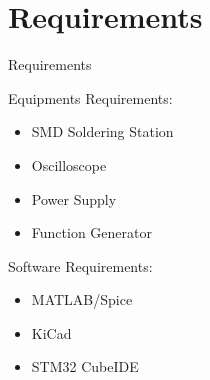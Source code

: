 \documentclass[aspectratio=169]{beamer}
\begin{document}
	\section{Requirements}
	\begin{frame}{Requirements}
		\begin{minipage}{0.5\textwidth}
			Equipments Requirements:
			\begin{itemize}
				
				\item SMD Soldering Station
				\item Oscilloscope
				\item Power Supply
				\item Function Generator
			\end{itemize} 
		\end{minipage}
		\begin{minipage}{0.3\textwidth}
			Software Requirements:
			\begin{itemize}
				
				\item MATLAB/Spice
				\item KiCad
				\item STM32 CubeIDE
				
			\end{itemize} 
			
		\end{minipage}
	\end{frame}
	
	
	
\end{document}
